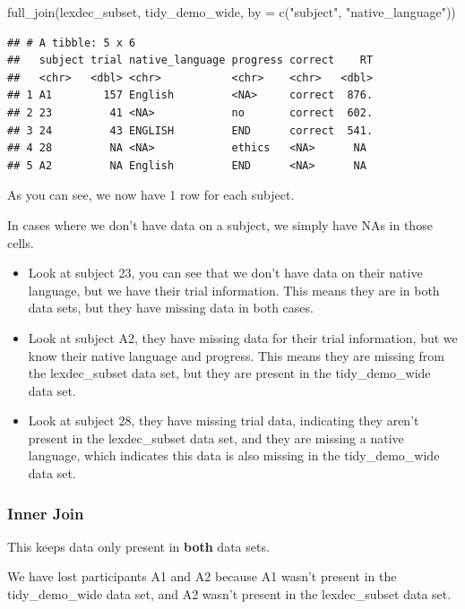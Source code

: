 \documentclass[
]{book}
\newenvironment{Shaded}{\begin{snugshade}}{\end{snugshade}}
\newcommand{\AttributeTok}[1]{\textcolor[rgb]{0.77,0.63,0.00}{#1}}
\newcommand{\FunctionTok}[1]{\textcolor[rgb]{0.00,0.00,0.00}{#1}}
\newcommand{\NormalTok}[1]{#1}
\newcommand{\StringTok}[1]{\textcolor[rgb]{0.31,0.60,0.02}{#1}}
\begin{document}
\begin{Shaded}
\begin{Highlighting}[]
\FunctionTok{full\_join}\NormalTok{(lexdec\_subset, tidy\_demo\_wide, }\AttributeTok{by =} \FunctionTok{c}\NormalTok{(}\StringTok{"subject"}\NormalTok{, }\StringTok{"native\_language"}\NormalTok{))}
\end{Highlighting}
\end{Shaded}

\begin{verbatim}
## # A tibble: 5 x 6
##   subject trial native_language progress correct    RT
##   <chr>   <dbl> <chr>           <chr>    <chr>   <dbl>
## 1 A1        157 English         <NA>     correct  876.
## 2 23         41 <NA>            no       correct  602.
## 3 24         43 ENGLISH         END      correct  541.
## 4 28         NA <NA>            ethics   <NA>      NA 
## 5 A2         NA English         END      <NA>      NA
\end{verbatim}

As you can see, we now have 1 row for each subject.

In cases where we don't have data on a subject, we simply have NAs in those cells.

\begin{itemize}
\item
  Look at subject 23, you can see that we don't have data on their native language, but we have their trial information. This means they are in both data sets, but they have missing data in both cases.
\item
  Look at subject A2, they have missing data for their trial information, but we know their native language and progress. This means they are missing from the lexdec\_subset data set, but they are present in the tidy\_demo\_wide data set.
\item
  Look at subject 28, they have missing trial data, indicating they aren't present in the lexdec\_subset data set, and they are missing a native language, which indicates this data is also missing in the tidy\_demo\_wide data set.
\end{itemize}

\hypertarget{inner-join}{%
\subsubsection{Inner Join}\label{inner-join}}

This keeps data only present in \textbf{both} data sets.

We have lost participants A1 and A2 because A1 wasn't present in the tidy\_demo\_wide data set, and A2 wasn't present in the lexdec\_subset data set.
\end{document}
